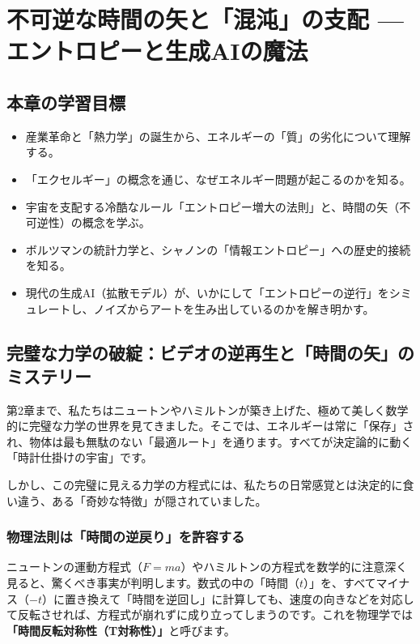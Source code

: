 \chapter{不可逆な時間の矢と「混沌」の支配 --- エントロピーと生成AIの魔法}

\section*{本章の学習目標}
\begin{itemize}
\item 産業革命と「熱力学」の誕生から、エネルギーの「質」の劣化について理解する。
\item 「エクセルギー」の概念を通じ、なぜエネルギー問題が起こるのかを知る。
\item 宇宙を支配する冷酷なルール「エントロピー増大の法則」と、時間の矢（不可逆性）の概念を学ぶ。
\item ボルツマンの統計力学と、シャノンの「情報エントロピー」への歴史的接続を知る。
\item 現代の生成AI（拡散モデル）が、いかにして「エントロピーの逆行」をシミュレートし、ノイズからアートを生み出しているのかを解き明かす。
\end{itemize}

\section{完璧な力学の破綻：ビデオの逆再生と「時間の矢」のミステリー}

第2章まで、私たちはニュートンやハミルトンが築き上げた、極めて美しく数学的に完璧な力学の世界を見てきました。そこでは、エネルギーは常に「保存」され、物体は最も無駄のない「最適ルート」を通ります。すべてが決定論的に動く「時計仕掛けの宇宙」です。

しかし、この完璧に見える力学の方程式には、私たちの日常感覚とは決定的に食い違う、ある「奇妙な特徴」が隠されていました。

\subsection{物理法則は「時間の逆戻り」を許容する}

ニュートンの運動方程式（\(F=ma\)）やハミルトンの方程式を数学的に注意深く見ると、驚くべき事実が判明します。数式の中の「時間（\(t\)）」を、すべてマイナス（\(-t\)）に置き換えて「時間を逆回し」に計算しても、速度の向きなどを対応して反転させれば、方程式が崩れずに成り立ってしまうのです。これを物理学では\textbf{「時間反転対称性（T対称性）」}と呼びます。

